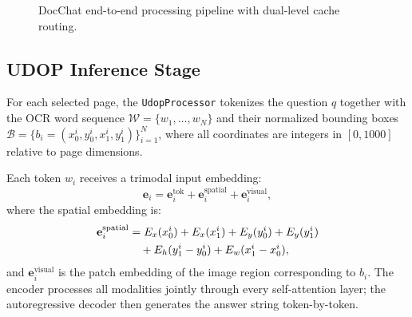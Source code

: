 \documentclass[conference]{IEEEtran}
\begin{document}
\begin{figure}[t]
\centering
{}
\caption{DocChat end-to-end processing pipeline with dual-level cache routing.}
\label{fig:pipeline}
\end{figure}

\subsection{UDOP Inference Stage}

For each selected page, the \texttt{UdopProcessor} tokenizes the question
$q$ together with the OCR word sequence $\mathcal{W} = \{w_1, \ldots, w_N\}$
and their normalized bounding boxes
$\mathcal{B} = \{b_i = (x_0^i, y_0^i, x_1^i, y_1^i)\}_{i=1}^N$,
where all coordinates are integers in $[0, 1000]$ relative to page dimensions.

Each token $w_i$ receives a trimodal input embedding:
\begin{equation}
    \mathbf{e}_i = \mathbf{e}^{\text{tok}}_i
                 + \mathbf{e}^{\text{spatial}}_i
                 + \mathbf{e}^{\text{visual}}_i,
    \label{eq:embed}
\end{equation}
where the spatial embedding is:
\begin{align}
    \mathbf{e}^{\text{spatial}}_i &=
        E_x(x_0^i) + E_x(x_1^i)
      + E_y(y_0^i) + E_y(y_1^i) \notag \\
      &\quad + E_h(y_1^i - y_0^i)
              + E_w(x_1^i - x_0^i),
    \label{eq:spatial}
\end{align}
and $\mathbf{e}^{\text{visual}}_i$ is the patch embedding of the image region
corresponding to $b_i$. The encoder processes all modalities jointly through
every self-attention layer; the autoregressive decoder then generates the
answer string token-by-token.
\end{document}
